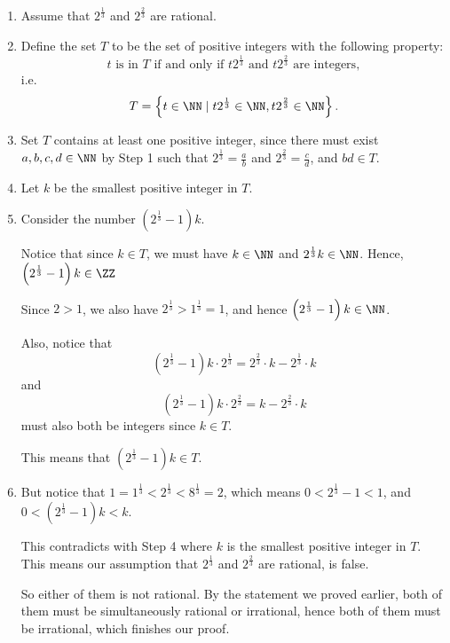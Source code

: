 \begin{enumerate}
          \begin{enumerate}
              \item Assume that \(2^{\frac{1}{3}}\) and \(2^{\frac{2}{3}}\) are rational.
              \item Define the set \(T\) to be the set of positive integers with the following property:
                    \[
                        t \text{ is in } T \text{ if and only if } t 2^{\frac{1}{3}} \text{ and } t2^{\frac{2}{3}} \text{ are integers},
                    \]
                    i.e.
                    \[
                        T = \left\{t \in \NN \mid t 2^{\frac{1}{3}} \in \NN, t 2^{\frac{2}{3}} \in \NN \right\}.
                    \]

              \item Set \(T\) contains at least one positive integer, since there must exist \(a, b, c, d \in \NN\) by Step 1 such that \(2^{\frac{1}{3}} = \frac{a}{b}\) and \(2^{\frac{2}{3}} = \frac{c}{d}\), and \(bd \in T\).
              \item Let \(k\) be the smallest positive integer in \(T\).
              \item Consider the number \(\left(2^{\frac{1}{3}} - 1\right)k\).

                    Notice that since \(k \in T\), we must have \(k \in \NN\) and \(2^{\frac{1}{3}} k \in \NN\). Hence, \(\left(2^{\frac{1}{3}} - 1\right)k \in \ZZ\)

                    Since \(2 > 1\), we also have \(2^{\frac{1}{3}} > 1^{\frac{1}{3}} = 1\), and hence \(\left(2^{\frac{1}{3}} - 1\right)k \in \NN\).

                    Also, notice that
                    \[
                        \left(2^{\frac{1}{3}} - 1\right)k \cdot 2^{\frac{1}{3}} = 2^{\frac{2}{3}} \cdot k - 2^{\frac{1}{3}} \cdot k
                    \]
                    and
                    \[
                        \left(2^{\frac{1}{3}} - 1\right)k \cdot 2^{\frac{2}{3}} = k - 2^{\frac{2}{3}} \cdot k
                    \]
                    must also both be integers since \(k \in T\).

                    This means that \(\left(2^{\frac{1}{3}} - 1\right)k \in T.\)
              \item But notice that \(1 = 1^{\frac{1}{3}} < 2^{\frac{1}{3}} < 8^{\frac{1}{3}} = 2\), which means \(0 < 2^{\frac{1}{3}} - 1 < 1\), and \(0 < \left(2^{\frac{1}{3}} - 1\right)k < k.\)

                    This contradicts with Step 4 where \(k\) is the smallest positive integer in \(T\). This means our assumption that \(2^{\frac{1}{3}}\) and \(2^{\frac{2}{3}}\) are rational, is false.

                    So either of them is not rational. By the statement we proved earlier, both of them must be simultaneously rational or irrational, hence both of them must be irrational, which finishes our proof.
          \end{enumerate}
\end{enumerate}